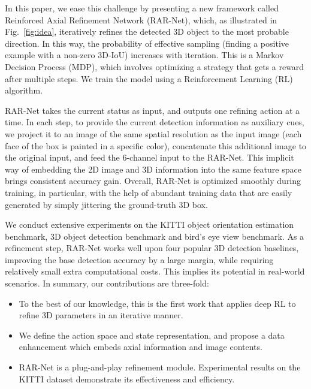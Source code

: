 \documentclass[runningheads]{llncs}
\begin{document}
In this paper, we ease this challenge by presenting a new framework called Reinforced Axial Refinement Network (RAR-Net), which, as illustrated in Fig.~\ref{fig:idea}, iteratively refines the detected 3D object to the most probable direction. In this way, the probability of effective sampling (finding a positive example with a non-zero 3D-IoU) increases with iteration. This is a Markov Decision Process (MDP), which involves optimizing a strategy that gets a reward after multiple steps. We train the model using a Reinforcement Learning (RL) algorithm.

RAR-Net takes the current status as input, and outputs one refining action at a time. In each step, to provide the current detection information as auxiliary cues, we project it to an image of the same spatial resolution as the input image (each face of the box is painted in a specific color), concatenate this additional image to the original input, and feed the 6-channel input to the RAR-Net. This implicit way of embedding the 2D image and 3D information into the same feature space brings consistent accuracy gain. Overall, RAR-Net is optimized smoothly during training, in particular, with the help of abundant training data that are easily generated by simply jittering the ground-truth 3D box. 

We conduct extensive experiments on the KITTI object orientation estimation benchmark, 3D object detection benchmark and bird's eye view benchmark. As a refinement step, RAR-Net works well upon four popular 3D detection baselines, improving the base detection accuracy by a large margin, while requiring relatively small extra computational costs. This implies its potential in real-world scenarios. In summary, our contributions are three-fold:
\begin{itemize}
\item To the best of our knowledge, this is the first work that applies deep RL to refine 3D parameters in an iterative manner.
\item We define the action space and state representation, and propose a data enhancement which embeds axial information and image contents.
\item RAR-Net is a plug-and-play refinement module. Experimental results on the KITTI dataset demonstrate its effectiveness and efficiency.
\end{itemize}
\end{document}
